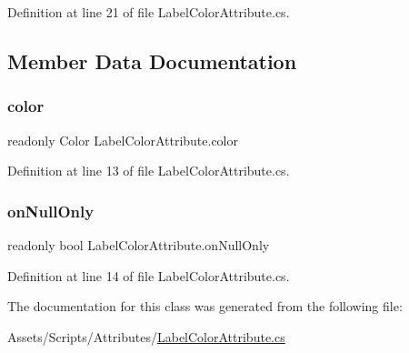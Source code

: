Definition at line 21 of file Label\+Color\+Attribute.\+cs.



\subsection{Member Data Documentation}
\mbox{\label{class_label_color_attribute_aface44d733139b93a6405875dd520d2f}} 
\subsubsection{\texorpdfstring{color}{color}}
{\footnotesize\ttfamily readonly Color Label\+Color\+Attribute.\+color}



Definition at line 13 of file Label\+Color\+Attribute.\+cs.

\mbox{\label{class_label_color_attribute_a72065bf4f5842783a1d3f78963421dba}} 
\subsubsection{\texorpdfstring{on\+Null\+Only}{onNullOnly}}
{\footnotesize\ttfamily readonly bool Label\+Color\+Attribute.\+on\+Null\+Only}



Definition at line 14 of file Label\+Color\+Attribute.\+cs.



The documentation for this class was generated from the following file\+:\begin{DoxyCompactItemize}
\item 
Assets/\+Scripts/\+Attributes/\mbox{\hyperlink{_label_color_attribute_8cs}{Label\+Color\+Attribute.\+cs}}\end{DoxyCompactItemize}
